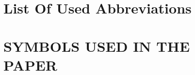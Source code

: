 
\tableofcontents
\newpage

\section*{\centering List Of Used Abbreviations}
\begin{adjustwidth}{113pt}{43pt}
	\begin{sortedlist}
	\end{sortedlist}
\end{adjustwidth}
\section*{SYMBOLS USED IN THE PAPER}

